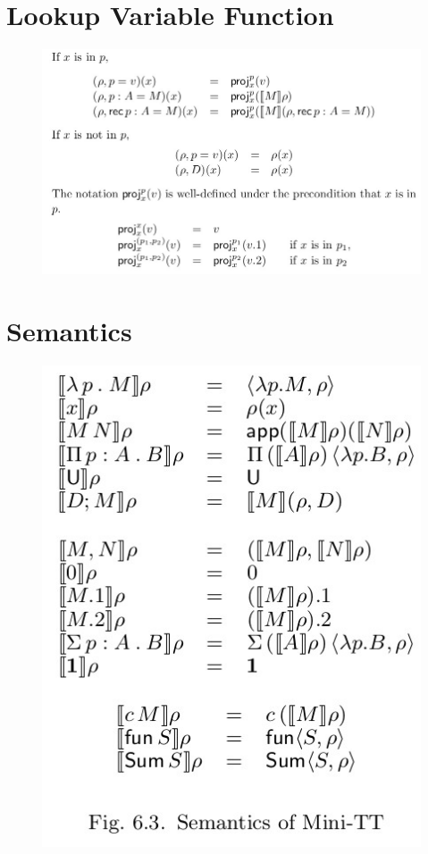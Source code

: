 \documentclass{article}
\begin{document}
\section{Lookup Variable Function}
\begin{figure}[h]
  \includegraphics[scale=0.4]{lookup_minitt}
\end{figure}

\section{Semantics}
\begin{figure}[h]
  \includegraphics[scale=0.4]{semantics_minitt}
  \centering
\end{figure}
\end{document}
